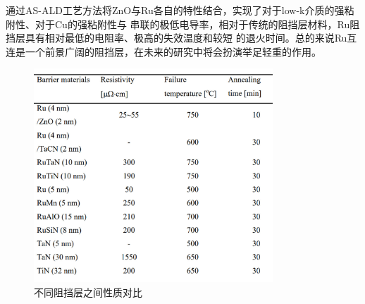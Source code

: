 \documentclass[UTF8,a4paper,12pt]{ctexart}%
\begin{document}
通过AS-ALD工艺方法将ZnO与Ru各自的特性结合，实现了对于low-k介质的强粘附性、对于Cu的强粘附性与
串联的极低电导率，相对于传统的阻挡层材料，Ru阻挡层具有相对最低的电阻率、极高的失效温度和较短
的退火时间。总的来说Ru互连是一个前景广阔的阻挡层，在未来的研究中将会扮演举足轻重的作用。
\begin{figure}[htb]
	\centering
	\includegraphics[width=0.8\textwidth]{25.jpg}
	\caption{不同阻挡层之间性质对比}
	\label{Fig:25}
\end{figure}



  
\end{document}
